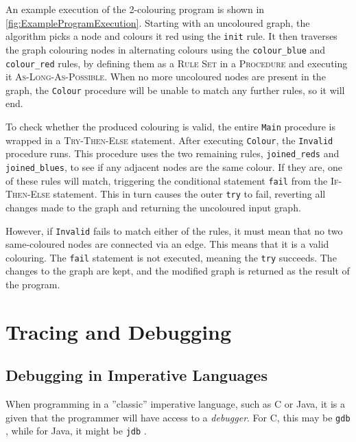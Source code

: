 \documentclass[authoryearcitations]{UoYCSproject}
\begin{document}
An example execution of the 2-colouring program is shown in \autoref{fig:ExampleProgramExecution}.
Starting with an uncoloured graph, the algorithm picks a node and colours it red
using the \texttt{init} rule. It then traverses the graph colouring nodes in
alternating colours using the \texttt{colour\_blue} and \texttt{colour\_red} rules,
by defining them as a \textsc{Rule Set} in a \textsc{Procedure} and executing
it \textsc{As-Long-As-Possible}. When no more uncoloured nodes are present in the
graph, the \texttt{Colour} procedure will be unable to match any further rules,
so it will end.

To check whether the produced colouring is valid, the entire \texttt{Main}
procedure is wrapped in a \textsc{Try-Then-Else} statement. After executing
\texttt{Colour}, the \texttt{Invalid} procedure runs. This procedure uses the
two remaining rules, \texttt{joined\_reds} and \texttt{joined\_blues}, to see if
any adjacent nodes are the same colour. If they are, one of these rules will
match, triggering the conditional statement \texttt{fail} from the
\textsc{If-Then-Else} statement. This in turn causes the outer \texttt{try} to
fail, reverting all changes made to the graph and returning the uncoloured input
graph.

However, if \texttt{Invalid} fails to match either of the rules, it must mean
that no two same-coloured nodes are connected via an edge. This means that it is
a valid colouring. The \texttt{fail} statement is not executed, meaning the
\texttt{try} succeeds. The changes to the graph are kept, and the modified graph
is returned as the result of the program.



\section{Tracing and Debugging}
\label{sec:TracingAndDebugging}


\subsection{Debugging in Imperative Languages}
\label{sec:DebuggingInImperativeLanguages}

When programming in a ''classic'' imperative language, such as C or Java, it is
a given that the programmer will have access to a \emph{debugger}. For C, this
may be \texttt{gdb} \citep{gdbsite}, while for Java, it might be \texttt{jdb}
\citep{jdbsite}.
\end{document}

